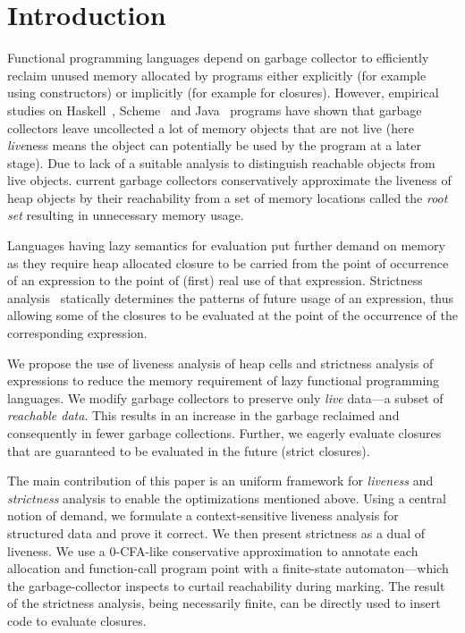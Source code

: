 \section{Introduction}
\label{sec:intro}

Functional  programming  languages  depend  on  garbage  collector  to
efficiently  reclaim  unused  memory   allocated  by  programs  either
explicitly (for example using constructors) or implicitly (for example
for      closures).       However,      empirical      studies      on
Haskell~\cite{rojemo96lag},  Scheme~\cite{karkare06effectiveness}  and
Java~\cite{shaham02estimating}  programs   have  shown   that  garbage
collectors leave uncollected a lot of memory objects that are not live
(here {\em live}ness  means the object can potentially be  used by the
program at  a later  stage).  Due  to lack of  a suitable  analysis to
distinguish  reachable  objects  from live  objects.  current  garbage
collectors conservatively approximate the  liveness of heap objects by
their reachability from a set of memory locations called the {\em root
  set\/} resulting in unnecessary memory usage.

Languages having lazy  semantics for evaluation put  further demand on
memory as they  require heap allocated closure to be  carried from the
point of occurrence  of an expression to the point  of (first) real use
of  that expression.  Strictness analysis~\cite{some-refs}  statically
determines  the  patterns  of  future usage  of  an  expression,  thus
allowing some  of the  closures to  be evaluated at  the point  of the
occurrence of the corresponding expression.

We propose the  use of liveness analysis of heap  cells and strictness
analysis  of expressions  to  reduce the  memory  requirement of  lazy
functional  programming languages.   We modify  garbage collectors  to
preserve  only {\em  live} data---a  subset of  {\em reachable  data}.
This results in an increase  in the garbage reclaimed and consequently
in fewer  garbage collections.  Further, we eagerly evaluate closures
that are guaranteed to be evaluated in the future (strict closures).

The main contribution  of this paper is an uniform  framework for {\em
  liveness} and {\em strictness}  analysis to enable the optimizations
mentioned  above. Using  a central  notion of  demand, we  formulate a
context-sensitive liveness  analysis for structured data  and prove it
correct.  We then  present strictness as a dual of  liveness. We use a
0-CFA-like conservative approximation to  annotate each allocation and
function-call program point with  a finite-state automaton---which the
garbage-collector inspects to curtail reachability during marking. The
result of  the strictness analysis,  being necessarily finite,  can be
directly used to insert code to evaluate closures.

